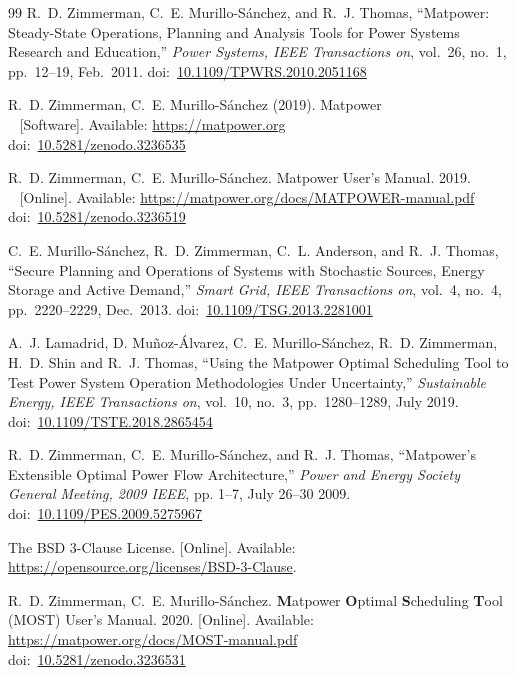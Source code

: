 \documentclass[12pt]{article}
\newcommand{\matpower}[0]{{\sc Matpower}}
\newcommand{\most}[0]{{MOST}}
\newcommand{\mostname}[0]{{{\bf M}{\sc atpower} \textbf{O}ptimal \textbf{S}cheduling \textbf{T}ool}}
\newcommand{\doi}[1]{doi:~\href{https://doi.org/#1}{#1}}
\numberwithin{equation}{section}
\numberwithin{table}{section}
\numberwithin{figure}{section}
\begin{document}
\clearpage
\begin{thebibliography}{99}
R.~D. Zimmerman, C.~E. Murillo-S{\'a}nchez, and R.~J. Thomas,
  ``\matpower{}: Steady-State Operations, Planning and Analysis Tools for Power Systems Research and Education,'' \emph{Power Systems, IEEE Transactions on}, vol.~26, no.~1, pp.~12--19, Feb.~2011.
\doi{10.1109/TPWRS.2010.2051168}

R.~D. Zimmerman, C.~E. Murillo-S{\'a}nchez (2019). \matpower{}\\~
[Software]. Available: \url{https://matpower.org}\\
\doi{10.5281/zenodo.3236535}

R.~D. Zimmerman, C.~E. Murillo-S{\'a}nchez. \matpower{} User's Manual. 2019.\\~
[Online]. Available: \url{https://matpower.org/docs/MATPOWER-manual.pdf}\\
\doi{10.5281/zenodo.3236519}

C.~E. Murillo-S{\'a}nchez, R.~D. Zimmerman, C.~L. Anderson, and R.~J. Thomas, ``Secure Planning and Operations of Systems with Stochastic Sources, Energy Storage and Active Demand,'' \emph{Smart Grid, IEEE Transactions on}, vol.~4, no.~4, pp.~2220--2229, Dec.~2013.
\doi{10.1109/TSG.2013.2281001}

A.~J. Lamadrid, D. Mu{\~n}oz-{\'A}lvarez, C.~E. Murillo-S{\'a}nchez, R.~D. Zimmerman, H.~D. Shin and R.~J. Thomas, ``Using the \matpower{} Optimal Scheduling Tool to Test Power System Operation Methodologies Under Uncertainty,'' \emph{Sustainable Energy, IEEE Transactions on}, vol.~10, no.~3, pp.~1280--1289, July 2019.
\doi{10.1109/TSTE.2018.2865454}

R.~D. Zimmerman, C.~E. Murillo-S{\'a}nchez, and R.~J. Thomas, ``\matpower{}'s
Extensible Optimal Power Flow Architecture,'' \emph{Power and Energy Society
General Meeting, 2009 IEEE}, pp. 1--7, July 26--30 2009.
\doi{10.1109/PES.2009.5275967}

The BSD 3-Clause License. [Online]. Available: \url{https://opensource.org/licenses/BSD-3-Clause}.

R.~D. Zimmerman, C.~E. Murillo-S{\'a}nchez. \mostname{} (\most{}) User's Manual. 2020. [Online]. Available: \url{https://matpower.org/docs/MOST-manual.pdf}\\
\doi{10.5281/zenodo.3236531}


\end{thebibliography}
\end{document}
